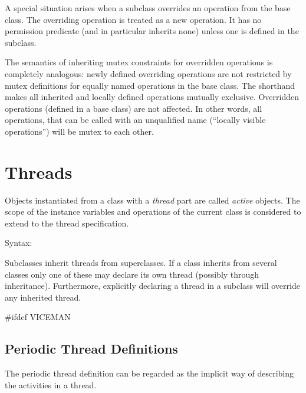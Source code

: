 \documentclass[\pformat,12pt]{article}
\begin{document}
A special situation arises when a subclass overrides an
operation from the base class. The overriding operation is
treated as a new operation.  It has no permission predicate (and in
particular inherits none) unless one is defined in the subclass.

The semantics of inheriting mutex constraints for overridden
operations is completely analogous: newly defined overriding
operations are not restricted by mutex definitions for equally named
operations in the base class. The  shorthand makes all
inherited and locally defined operations mutually
exclusive. Overridden operations (defined in a base class) are not
affected. In other words, all operations, that can be called with an
unqualified name (``locally visible operations'') will be mutex to
each other.



\section{Threads}\label{ch:thread}

Objects instantiated from a class with a {\em thread} part are called
{\em active} objects.  The scope of the instance variables and 
operations of the current class is considered to extend to the thread
specification.

\begin{description}
\item[Syntax:]   
\end{description}

Subclasses inherit threads from superclasses. 
If a class inherits from several classes only one of these may declare
its own thread (possibly through inheritance). Furthermore, explicitly
declaring a thread in a subclass will override any inherited thread.  

#ifdef VICEMAN
\subsection{Periodic Thread Definitions}\label{se:periodic-thread}

The periodic thread definition can be regarded as the implicit way
of describing the activities in a thread.
\end{document}
